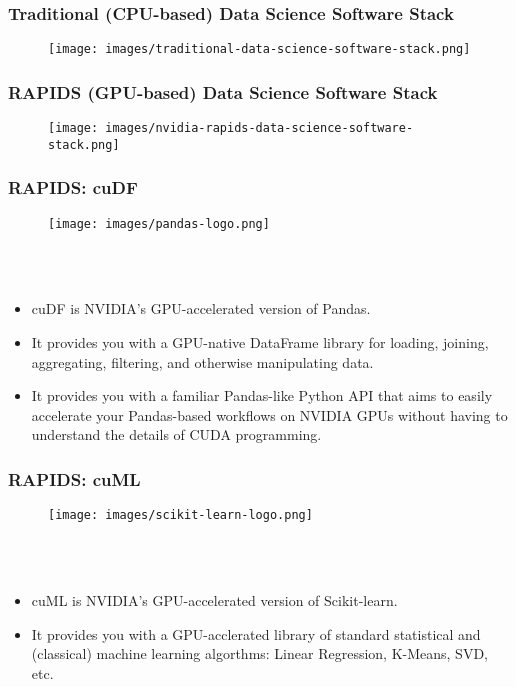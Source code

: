\documentclass{beamer}
\begin{document}
\begin{frame}
   \frametitle{Traditional (CPU-based) Data Science Software Stack}
   \begin{figure}[htbp]
      \texttt{[image: images/traditional-data-science-software-stack.png]}
   \end{figure}
\end{frame}

\begin{frame}
   \frametitle{RAPIDS (GPU-based) Data Science Software Stack}
   \begin{figure}[htbp]
      \texttt{[image: images/nvidia-rapids-data-science-software-stack.png]}
   \end{figure}
\end{frame}

\begin{frame}
   \frametitle{RAPIDS: cuDF}
   \begin{figure}[htbp]
      \texttt{[image: images/pandas-logo.png]}
   \end{figure}
   \ \\ \ \\
   \begin{itemize}\setlength\itemsep{1.5em}
      \item cuDF is NVIDIA's GPU-accelerated version of Pandas.
      \item It provides you with a GPU-native DataFrame library for 
         loading, joining, aggregating, filtering, and otherwise 
         manipulating data.
      \item It provides you with a familiar Pandas-like Python API that
         aims to easily accelerate your Pandas-based workflows on NVIDIA 
         GPUs without having to understand the details of CUDA programming.
   \end{itemize}
\end{frame}

\begin{frame}
   \frametitle{RAPIDS: cuML}
   \begin{figure}[htbp]
      \texttt{[image: images/scikit-learn-logo.png]}
   \end{figure}
   \ \\ \ \\
   \begin{itemize}\setlength\itemsep{1.5em}
      \item cuML is NVIDIA's GPU-accelerated version of Scikit-learn.
      \item It provides you with a GPU-acclerated library of standard 
         statistical and (classical) machine learning algorthms: Linear
         Regression, K-Means, SVD, etc.
   \end{itemize}
\end{frame}
\end{document}
